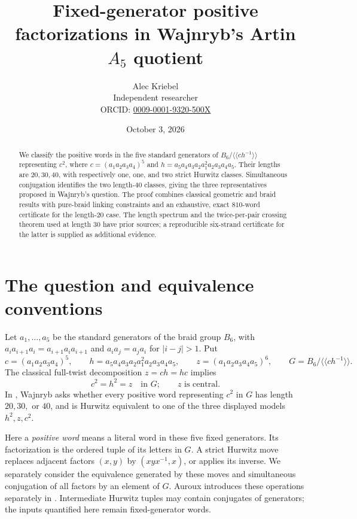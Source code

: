 \documentclass[11pt]{article}
\title{Fixed-generator positive factorizations in Wajnryb's Artin \(A_5\) quotient}
\author{Alec Kriebel\\
\small Independent researcher\\
\small ORCID: \href{https://orcid.org/0009-0001-9320-500X}{0009-0001-9320-500X}}
\date{October 3, 2026}
\newcommand{\B}{B_6}
\newcommand{\normal}[1]{\langle\!\langle #1\rangle\!\rangle}
\begin{document}
\maketitle
\begin{abstract}
We classify the positive words in the five standard generators of
\(B_6/\normal{ch^{-1}}\) representing \(c^2\), where
\(c=(a_1a_2a_3a_4)^5\) and \(h=a_5a_4a_3a_2a_1^2a_2a_3a_4a_5\).
Their lengths are \(20,30,40\), with respectively one, one, and two
strict Hurwitz classes. Simultaneous conjugation identifies the two
length-\(40\) classes, giving the three representatives proposed in
Wajnryb's question. The proof combines classical geometric and braid
results with pure-braid linking constraints and an exhaustive,
exact \(810\)-word certificate for the length-\(20\) case.
The length spectrum and the twice-per-pair crossing theorem used at
length \(30\) have prior sources; a reproducible six-strand certificate
for the latter is supplied as additional evidence.
\end{abstract}

\section{The question and equivalence conventions}

Let \(a_1,\ldots,a_5\) be the standard generators of the braid group
\(\B\), with \(a_i a_{i+1}a_i=a_{i+1}a_i a_{i+1}\) and
\(a_i a_j=a_j a_i\) for \(|i-j|>1\). Put
\[
 c=(a_1a_2a_3a_4)^5,\qquad
 h=a_5a_4a_3a_2a_1^2a_2a_3a_4a_5,\qquad
 z=(a_1a_2a_3a_4a_5)^6,\qquad
 G=\B/\normal{ch^{-1}}.
\]
The classical full-twist decomposition \(z=ch=hc\) implies
\begin{equation}\label{central}
 c^2=h^2=z \quad\text{in }G;
 \qquad z\text{ is central.}
\end{equation}
In \cite[Section 3, p.~126 of the linked online version]{W},
Wajnryb asks whether every positive word representing \(c^2\) in \(G\)
has length \(20,30,\) or \(40\), and is Hurwitz equivalent to one of
the three displayed models \(h^2,z,c^2\).

Here a \emph{positive word} means a literal word in these five fixed
generators. Its factorization is the ordered tuple of its letters
in \(G\). A strict Hurwitz move replaces adjacent factors
\((x,y)\) by \((xyx^{-1},x)\), or applies its inverse.
We separately consider the equivalence generated by these moves
and simultaneous conjugation of all factors by an element of \(G\).
Auroux introduces these operations separately in
\cite[Section 1, p.~131 of the linked online version]{A}.
Intermediate Hurwitz tuples may contain conjugates of generators;
the inputs quantified here remain fixed-generator words.
\end{document}
